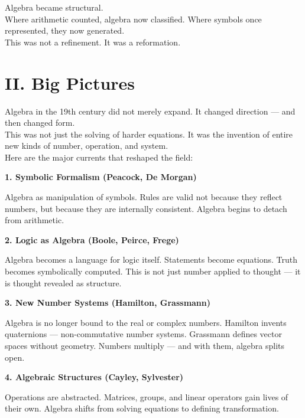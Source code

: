 \documentclass[9pt]{article}
\begin{document}
Algebra became structural.\\

\noindent
Where arithmetic counted, algebra now classified.  
Where symbols once represented, they now generated.\\

This was not a refinement. It was a reformation.\\

\newpage

\section*{II. Big Pictures}

Algebra in the 19th century did not merely expand.  
It changed direction — and then changed form.\\

\noindent
This was not just the solving of harder equations.  
It was the invention of entire new kinds of number, operation, and system.\\

\noindent
Here are the major currents that reshaped the field:

\bigskip

\textbf{1. Symbolic Formalism (Peacock, De Morgan)}

Algebra as manipulation of symbols.  
Rules are valid not because they reflect numbers, but because they are internally consistent.  
Algebra begins to detach from arithmetic.

\bigskip

\textbf{2. Logic as Algebra (Boole, Peirce, Frege)}

Algebra becomes a language for logic itself.  
Statements become equations. Truth becomes symbolically computed.  
This is not just number applied to thought — it is thought revealed as structure.

\bigskip

\textbf{3. New Number Systems (Hamilton, Grassmann)}

Algebra is no longer bound to the real or complex numbers.  
Hamilton invents quaternions — non-commutative number systems.  
Grassmann defines vector spaces without geometry.  
Numbers multiply — and with them, algebra splits open.

\bigskip

\textbf{4. Algebraic Structures (Cayley, Sylvester)}

Operations are abstracted.  
Matrices, groups, and linear operators gain lives of their own.  
Algebra shifts from solving equations to defining transformation.
\end{document}
